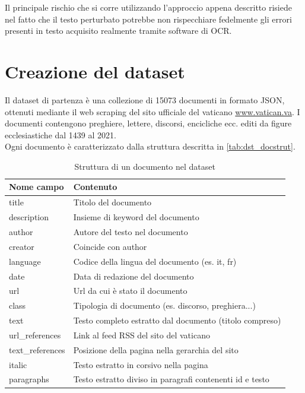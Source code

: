 Il principale rischio che si corre utilizzando l'approccio appena descritto risiede nel fatto che il testo perturbato potrebbe non rispecchiare fedelmente gli errori presenti in testo acquisito realmente tramite software di OCR.

\vfill
\section{Creazione del dataset}
\label{dst:creazione}
Il dataset di partenza è una collezione di 15073 documenti in formato JSON, ottenuti mediante il web scraping del sito ufficiale del vaticano \url{www.vatican.va}. I documenti contengono preghiere, lettere, discorsi, encicliche ecc. editi da figure ecclesiastiche dal 1439 al 2021.\\
Ogni documento è caratterizzato dalla struttura descritta in \autoref{tab:dst_docstrut}.


\begin{table}[H]
\centering
\begin{tabular}{ll}
\textbf{Nome campo} & \textbf{Contenuto} \\ \hline
title & Titolo del documento \\
description & Insieme di keyword del documento\\
author & Autore del testo nel documento \\
creator & Coincide con author \\
language & Codice della lingua del documento (es. it, fr) \\
date & Data di redazione del documento \\
url & Url da cui è stato il documento \\
class & Tipologia di documento (es. discorso, preghiera...)\\
text & Testo completo estratto dal documento (titolo compreso)\\
url\_references & Link al feed RSS del sito del vaticano \\
text\_references & Posizione della pagina nella gerarchia del sito\\
italic & Testo estratto in corsivo nella pagina \\
paragraphs & Testo estratto diviso in paragrafi contenenti id e testo
\end{tabular}
\caption{Struttura di un documento nel dataset}
\label{tab:dst_docstrut}
\end{table}

